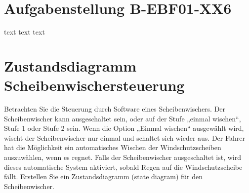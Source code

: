 \documentclass[
%
ngerman %
%
numeric %
]{wbh-assignment}
\begin{document}

\onehalfspacing
{}
\tableofcontents %
\cleardoublepage


\renewcommand{\sectionmark}[1]{\markright{#1}}
\renewcommand{\subsectionmark}[1]{}
\renewcommand{\subsubsectionmark}[1]{}

\onehalfspacing
\renewcommand{\thesection}{\arabic{section}}
\renewcommand{\theHsection}{\arabic{section}}
\setcounter{section}{0}

\section*{Aufgabenstellung B-EBF01-XX6}
text
\cleardoublepage
text
\cleardoublepage
text
\cleardoublepage

\section{Zustandsdiagramm Scheibenwischersteuerung}
\begin{aufgabenstellung}
Betrachten Sie die Steuerung durch Software eines Scheibenwischers. Der Scheibenwischer kann ausgeschaltet sein, oder auf der Stufe „einmal wischen“, Stufe 1 oder Stufe 2 sein.
Wenn die Option „Einmal wischen“ ausgewählt wird, wischt der Scheibenwischer nur einmal und schaltet sich wieder aus.
Der Fahrer hat die Möglichkeit ein automatisches Wischen der Windschutzscheiben auszuwählen, wenn es regnet.
Falls der Scheibenwischer ausgeschaltet ist, wird dieses automatische System aktiviert, sobald Regen auf die Windschutzscheibe fällt.
Erstellen Sie ein Zustandsdiagramm (state diagram) für den Scheibenwischer.
\end{aufgabenstellung}
\label{sec:state_diagram}
\end{document}
